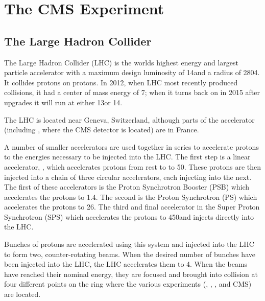 
\chapter{The CMS Experiment}
\label{experiment_chapter}

\section{The Large Hadron Collider}

The Large Hadron Collider (LHC) is the worlds highest energy and largest
particle accelerator with a maximum design luminosity of 14\TeV and a radius of
2804\meters. It collides protons on protons. In 2012, when LHC most recently
produced collisions, it had a center of mass energy of 7\TeV; when it turns back
on in 2015 after upgrades it will run at either 13\TeV or 14\TeV.

The LHC is located near Geneva, Switzerland, although parts of the accelerator
(including \pointfive, where the CMS detector is located) are in France.

A number of smaller accelerators are used together in series to accelerate
protons to the energies necessary to be injected into the LHC. The first step is
a linear accelerator, \linactwo, which accelerates protons from rest to to
50\MeV. These protons are then injected into a chain of three circular
accelerators, each injecting into the next. The first of these accelerators is
the Proton Synchrotron Booster (PSB) which accelerates the protons to 1.4\GeV.
The second is the Proton Synchrotron (PS) which accelerates the protons to
26\GeV. The third and final accelerator in the Super Proton Synchrotron (SPS)
which accelerates the protons to 450\GeV and injects directly into the LHC.

Bunches of protons are accelerated using this system and injected into the LHC
to form two, counter-rotating beams. When the desired number of bunches have
been injected into the LHC, the LHC accelerates them to 4\TeV. When the beams
have reached their nominal energy, they are focused and brought into collision
at four different points on the ring where the various experiments (\ALICE,
\ATLAS, \LHCB, and CMS) are located.
